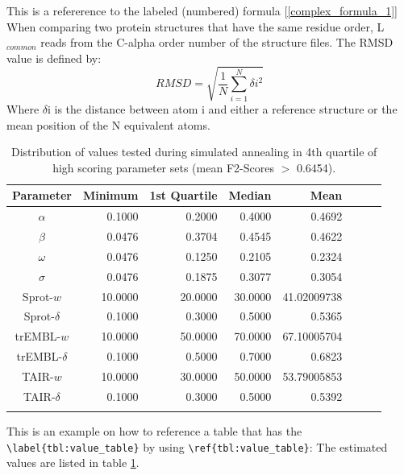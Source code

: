 This is a refererence to the labeled (numbered) formula [\ref{complex_formula_1}]
When comparing two protein structures that have the same residue order, L$_{common}$ 
reads from the C-alpha order number of the structure files. The \acrshort{RMSD}
value is defined by: \[ RMSD = \sqrt{\frac{1}{N}\sum_{i=1}^{N} \delta i^2} \]
Where $\delta$i is the distance between atom i and either a reference structure 
or the mean position of the N equivalent atoms.


\begin{table}[H]
  \begin{center}
    \caption[Distribution of values tested during simulated annealing in 4th
    quartile of high scoring parameter sets]{Distribution of values tested during
    simulated annealing in 4th quartile of high scoring parameter sets (mean
    F2-Scores $>$ 0.6454).}
    \begin{tabular}{c r r r r r r r}%
      \toprule{}%
      Parameter & Minimum & 1st Quartile & Median & Mean \\
      \midrule{}%
      $\alpha$        & 0.1000 & 0.2000 & 0.4000 & 0.4692     \\
      $\beta$         & 0.0476 & 0.3704 & 0.4545 & 0.4622     \\
      $\omega$        & 0.0476 & 0.1250 & 0.2105 & 0.2324     \\
      $\sigma$        & 0.0476 & 0.1875 & 0.3077 & 0.3054     \\
      Sprot-$w$       & 10.0000 & 20.0000 & 30.0000 & 41.02009738 \\
      Sprot-$\delta$  & 0.1000 & 0.3000 & 0.5000 & 0.5365    \\
      trEMBL-$w$      & 10.0000 & 50.0000 & 70.0000 & 67.10005704 \\
      trEMBL-$\delta$ & 0.1000 & 0.5000 & 0.7000 & 0.6823     \\
      TAIR-$w$        & 10.0000 & 30.0000 & 50.0000 & 53.79005853 \\
      TAIR-$\delta$   & 0.1000 & 0.3000 & 0.5000 & 0.5392     \\
      \bottomrule{}%
    \end{tabular}
    \label{tbl:value_table}
  \end{center}
\end{table}

This is an example on how to reference a table that has the
\verb|\label{tbl:value_table}| by using \verb|\ref{tbl:value_table}|: The
estimated values are listed in table \ref{tbl:value_table}.
